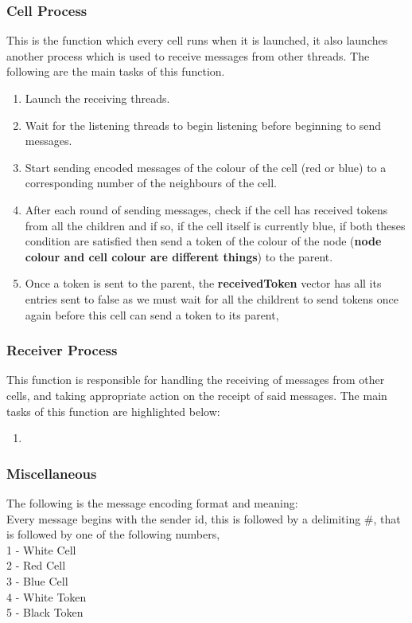 \documentclass[a4paper,12pt]{report}
\begin{document}
\subsubsection{Cell Process}
This is the function which every cell runs when it is launched, it also launches another process which is used to receive messages from other threads. The following are the main tasks of this function.
\begin{enumerate}
\item Launch the receiving threads.
\item Wait for the listening threads to begin listening before beginning to send messages.
\item Start sending encoded messages of the colour of the cell (red or blue) to a corresponding number of the neighbours of the cell.
\item After each round of sending messages, check if the cell has received tokens from all the children and if so, if the cell itself is currently blue, if both theses condition are satisfied then send a token of the colour of the node (\textbf{node colour and cell colour are different things}) to the parent.
\item Once a token is sent to the parent, the \textbf{receivedToken} vector has all its entries sent to false as we must wait for all the childrent to send tokens once again before this cell can send a token to its parent,
\end{enumerate}
\subsubsection{Receiver Process}
This function is responsible for handling the receiving of messages from other cells, and taking appropriate action on the receipt of said messages.
The main tasks of this function are highlighted below:
\begin{enumerate}
\item 
\end{enumerate}
\subsubsection{Miscellaneous}
The following is the message encoding format and meaning:\\
Every message begins with the sender id, this is followed by a delimiting \#, that is followed by one of the following numbers,\\
 1 - White Cell\\
 2 - Red Cell\\
 3 - Blue Cell\\
 4 - White Token\\
 5 - Black Token\\
\end{document}
